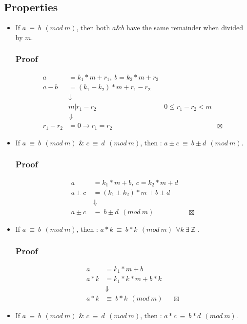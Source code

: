 \documentclass[11pt,twoside]{article}
\theoremstyle{defi}
\begin{document}
\subsection{Properties}
\begin{itemize}
\item If $a\ \equiv\ b\ \ (mod\ m)$, then both $a \& b$ have the same remainder when divided by $m$.
\subsubsection{Proof}
\begin{align*}
a &= k_1*m + r_1,\ b = k_2*m+r_2 \\
a-b&=(k_1-k_2)*m+r_1-r_2 \\
& \downarrow \\
& m | r_1-r_2 & 0 \leq r_1-r_2 < m \\
&\Downarrow\\
r_1-r_2&=0 \rightarrow r_1 = r_2
&&\boxtimes
\end{align*}

\item If $a\ \equiv\ b\ \ (mod\ m)$ \& $c\ \equiv\ d\ \ (mod\ m)$, then : $a\pm c\ \equiv\ b \pm d\ \ (mod\ m)$.
\subsubsection{Proof}
\begin{align*}
a &= k_1*m + b,\ c = k_2*m+d \\
a \pm c &= (k_1 \pm k_2)*m+b \pm d \\
& \Downarrow \\
a\pm c\ &\equiv\ b \pm d\ \ (mod\ m)
&&\boxtimes
\end{align*}

\item If $a\ \equiv\ b\ \ (mod\ m)$, then : $a*k\ \equiv\ b*k\ \ (mod\ m)\ \ \forall k\ \exists\ \mathbb{Z}$ .
\subsubsection{Proof}
\begin{align*}
a &= k_1*m + b\\
a * k &= k_1*k*m + b*k\\ 
& \Downarrow \\
a*k &\equiv\ b*k\ \ (mod\ m)
&&\boxtimes
\end{align*}

\item If $a\ \equiv\ b\ \ (mod\ m)$ \& $c\ \equiv\ d\ \ (mod\ m)$, then : $a*c\ \equiv\ b*d\ \ (mod\ m)$.

\end{itemize}
\end{document}
